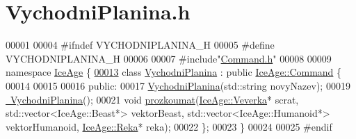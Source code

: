 \hypertarget{VychodniPlanina_8h_source}{}\section{Vychodni\+Planina.\+h}
\label{VychodniPlanina_8h_source}

\begin{DoxyCode}
00001 
00004 \textcolor{preprocessor}{#ifndef VYCHODNIPLANINA\_H}
00005 \textcolor{preprocessor}{#define VYCHODNIPLANINA\_H}
00006 
00007 \textcolor{preprocessor}{#include"\hyperlink{Command_8h}{Command.h}"}
00008 
00009 \textcolor{keyword}{namespace }\hyperlink{namespaceIceAge}{IceAge} \{
\hypertarget{VychodniPlanina_8h_source.tex_l00013}{}\hyperlink{classIceAge_1_1VychodniPlanina}{00013}     \textcolor{keyword}{class }\hyperlink{classIceAge_1_1VychodniPlanina}{VychodniPlanina} : \textcolor{keyword}{public} \hyperlink{classIceAge_1_1Command}{IceAge::Command} \{
00014 
00015 
00016     \textcolor{keyword}{public}:
00017         \hyperlink{classIceAge_1_1VychodniPlanina_a679da22865d75e93d1631106f5985b54}{VychodniPlanina}(std::string novyNazev);
00019         \hyperlink{classIceAge_1_1VychodniPlanina_ab5893e0634c3c34aaf979c0b4df583f7}{~VychodniPlanina}();
00021         \textcolor{keywordtype}{void} \hyperlink{classIceAge_1_1VychodniPlanina_af101def5e75ce2eb54c221063ee6ffca}{prozkoumat}(\hyperlink{classIceAge_1_1Veverka}{IceAge::Veverka}* scrat, std::vector<IceAge::Beast*> 
      vektorBeast, std::vector<IceAge::Humanoid*> vektorHumanoid, \hyperlink{classIceAge_1_1Reka}{IceAge::Reka}* reka);
00022     \};
00023 \}
00024 
00025 \textcolor{preprocessor}{#endif}
\end{DoxyCode}
